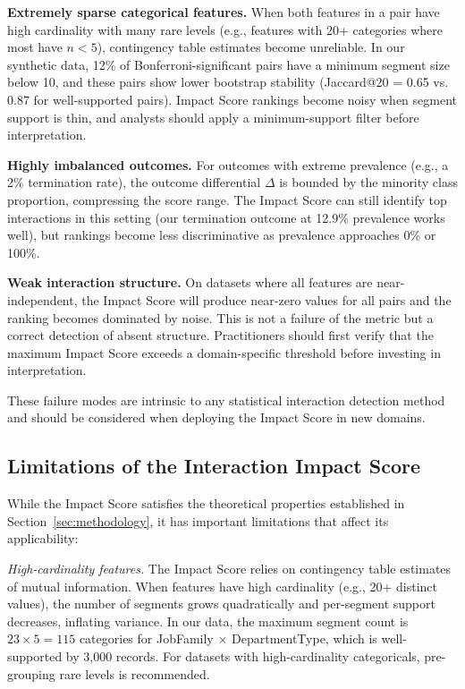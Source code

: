\documentclass[conference]{IEEEtran}
\begin{document}
\textbf{Extremely sparse categorical features.} When both features in a pair have high cardinality with many rare levels (e.g., features with 20+ categories where most have $n < 5$), contingency table estimates become unreliable. In our synthetic data, 12\% of Bonferroni-significant pairs have a minimum segment size below 10, and these pairs show lower bootstrap stability (Jaccard@20 = 0.65 vs. 0.87 for well-supported pairs). Impact Score rankings become noisy when segment support is thin, and analysts should apply a minimum-support filter before interpretation.

\textbf{Highly imbalanced outcomes.} For outcomes with extreme prevalence (e.g., a 2\% termination rate), the outcome differential $\Delta$ is bounded by the minority class proportion, compressing the score range. The Impact Score can still identify top interactions in this setting (our termination outcome at 12.9\% prevalence works well), but rankings become less discriminative as prevalence approaches 0\% or 100\%.

\textbf{Weak interaction structure.} On datasets where all features are near-independent, the Impact Score will produce near-zero values for all pairs and the ranking becomes dominated by noise. This is not a failure of the metric but a correct detection of absent structure. Practitioners should first verify that the maximum Impact Score exceeds a domain-specific threshold before investing in interpretation.

These failure modes are intrinsic to any statistical interaction detection method and should be considered when deploying the Impact Score in new domains.

\subsection{Limitations of the Interaction Impact Score}
\label{sec:limitations}

While the Impact Score satisfies the theoretical properties established in Section~\ref{sec:methodology}, it has important limitations that affect its applicability:

\textit{High-cardinality features.} The Impact Score relies on contingency table estimates of mutual information. When features have high cardinality (e.g., 20+ distinct values), the number of segments grows quadratically and per-segment support decreases, inflating variance. In our data, the maximum segment count is $23 \times 5 = 115$ categories for JobFamily $\times$ DepartmentType, which is well-supported by 3,000 records. For datasets with high-cardinality categoricals, pre-grouping rare levels is recommended.
\end{document}

